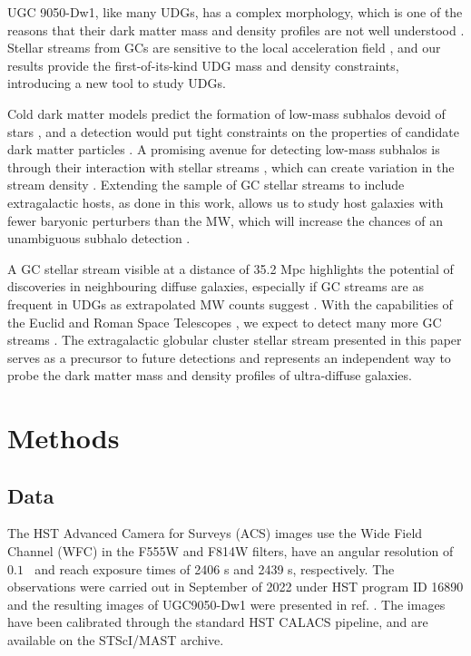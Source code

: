 \documentclass[pdflatex,sn-mathphys-num]{sn-jnl}
\theoremstyle{thmstyleone}
\DeclareMathOperator{\arcsec}{^{\prime\prime}}
\theoremstyle{thmstyletwo}
\theoremstyle{thmstylethree}
\begin{document}
UGC 9050-Dw1, like many UDGs, has a complex morphology, which is one of the reasons that their dark matter mass and density profiles are not well understood \citep{Shi2021,Brook2021}.
Stellar streams from GCs are sensitive to the local acceleration field \citep{bonaca2018,nibauer2022}, and our results provide the first-of-its-kind UDG mass and density constraints, introducing a new tool to study UDGs.

Cold dark matter models predict the formation of low-mass subhalos devoid of stars \citep{Diemand2008}, and a detection would put tight constraints on the properties of candidate dark matter particles \citep{Bullock2017}.
A promising avenue for detecting low-mass subhalos is through their interaction with stellar streams \citep{nibauer2025b}, which can create variation in the stream density \citep{Bonaca2019a, Bovy2017}.
Extending the sample of GC stellar streams to include extragalactic hosts, as done in this work, allows us to study host galaxies with fewer baryonic perturbers than the MW, which will increase the chances of an unambiguous subhalo detection \citep{
BanikBovy2019}.

A GC stellar stream visible at a distance of 35.2 Mpc highlights the potential of discoveries in neighbouring diffuse galaxies, especially if GC streams are as frequent in UDGs as extrapolated MW counts suggest \citep{Pearson2024, Le2025}.
With the capabilities of the Euclid and Roman Space Telescopes \citep{Roman:Spergel2015,Racca2016},
we expect to detect many more GC streams
\citep{Pearson2019, Pearson2022a,Aganze2024}.
The extragalactic globular cluster stellar stream presented in this paper serves as a precursor to future detections and represents an independent way to probe the dark matter mass and density profiles of ultra-diffuse galaxies.



\section{Methods}\label{sec:methods}
\subsection{Data}
The HST Advanced Camera for Surveys (ACS) images use the Wide Field Channel (WFC) in the F555W and F814W filters, have an angular resolution of $0.1\arcsec$ and reach exposure times of 2406 s and 2439 s, respectively.
The observations were carried out in September of 2022 under HST program ID 16890 \citep{Sand2021} and the resulting images of UGC9050-Dw1 were presented in ref. \citep{Fielder2023}.
The images have been calibrated through the standard HST CALACS pipeline, and are available on the STScI/MAST archive.
\end{document}
